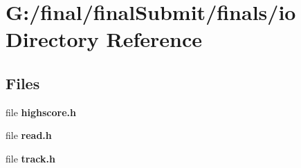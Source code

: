 \section{G\-:/final/final\-Submit/finals/io Directory Reference}
\label{dir_b0342e64248e4924288a40fb8f062dc5}
\subsection*{Files}
\begin{DoxyCompactItemize}
\item 
file {\bf highscore.\-h}
\item 
file {\bf read.\-h}
\item 
file {\bf track.\-h}
\end{DoxyCompactItemize}
